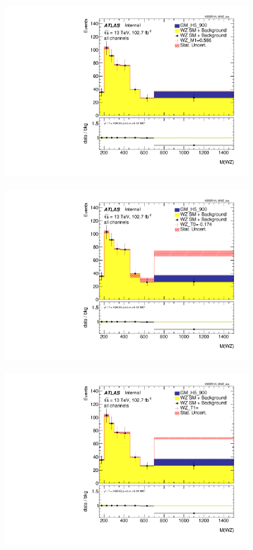 \documentclass[../Bachelorarbeit.tex]{subfiles}
\begin{document}
\begin{figure}[h]
\begin{subfigure}{0.45\textwidth}
        \includegraphics[width=\textwidth]{Plots/ALL_MWZ_right_color/GM_H5_900/M1/2022-05-07/VBSSR/all_VV_MWZ_vbs.pdf}
    \end{subfigure}
    \begin{subfigure}{0.45\textwidth}
        \includegraphics[width=\textwidth]{Plots/ALL_MWZ_right_color/GM_H5_900/T0/2022-05-07/VBSSR/all_VV_MWZ_vbs.pdf}
    \end{subfigure}
    \begin{subfigure}{0.45\textwidth}
        \includegraphics[width=\textwidth]{Plots/ALL_MWZ_right_color/GM_H5_900/T1/2022-05-07/VBSSR/all_VV_MWZ_vbs.pdf}

\end{subfigure}
\end{figure}
\end{document}
